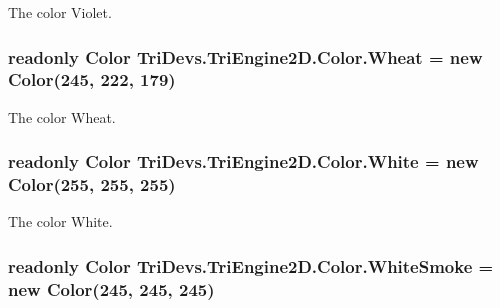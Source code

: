 The color Violet. 

\hypertarget{struct_tri_devs_1_1_tri_engine2_d_1_1_color_a3e2cb6ef2db84bc381491daceb76e214}{
\subsubsection[{Wheat}]{\setlength{\rightskip}{0pt plus 5cm}readonly {\bf Color} Tri\-Devs.\-Tri\-Engine2\-D.\-Color.\-Wheat = new {\bf Color}(245, 222, 179)\hspace{0.3cm}{\ttfamily [static]}}}\label{struct_tri_devs_1_1_tri_engine2_d_1_1_color_a3e2cb6ef2db84bc381491daceb76e214}


The color Wheat. 

\hypertarget{struct_tri_devs_1_1_tri_engine2_d_1_1_color_a357b7882f6ad2927ccbbb770771ada26}{
\subsubsection[{White}]{\setlength{\rightskip}{0pt plus 5cm}readonly {\bf Color} Tri\-Devs.\-Tri\-Engine2\-D.\-Color.\-White = new {\bf Color}(255, 255, 255)\hspace{0.3cm}{\ttfamily [static]}}}\label{struct_tri_devs_1_1_tri_engine2_d_1_1_color_a357b7882f6ad2927ccbbb770771ada26}


The color White. 

\hypertarget{struct_tri_devs_1_1_tri_engine2_d_1_1_color_a13ce5fdf675d896e3d52195cc5dbe022}{
\subsubsection[{White\-Smoke}]{\setlength{\rightskip}{0pt plus 5cm}readonly {\bf Color} Tri\-Devs.\-Tri\-Engine2\-D.\-Color.\-White\-Smoke = new {\bf Color}(245, 245, 245)\hspace{0.3cm}{\ttfamily [static]}}}\label{struct_tri_devs_1_1_tri_engine2_d_1_1_color_a13ce5fdf675d896e3d52195cc5dbe022}


